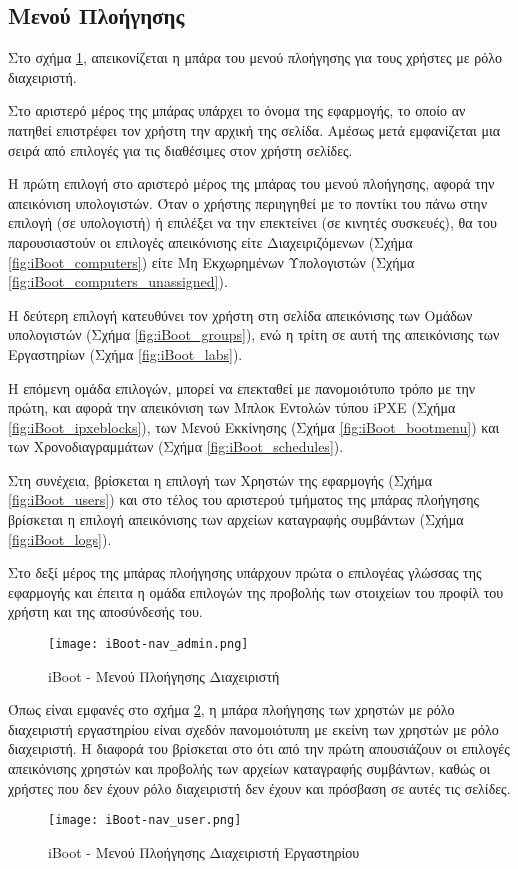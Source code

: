 \subsection{Μενού Πλοήγησης}
\FloatBarrier
Στο σχήμα \ref{fig:iBoot_nav_admin}, απεικονίζεται η μπάρα του μενού πλοήγησης για τους χρήστες με ρόλο διαχειριστή.

Στο αριστερό μέρος της μπάρας υπάρχει το όνομα της εφαρμογής, το οποίο αν πατηθεί επιστρέφει τον χρήστη την αρχική της σελίδα. Αμέσως μετά εμφανίζεται μια σειρά από επιλογές για τις διαθέσιμες στον χρήστη σελίδες.

Η πρώτη επιλογή στο αριστερό μέρος της μπάρας του μενού πλοήγησης, αφορά την απεικόνιση υπολογιστών. Όταν ο χρήστης περιηγηθεί με το ποντίκι του πάνω στην επιλογή (σε υπολογιστή) ή επιλέξει να την επεκτείνει (σε κινητές συσκευές), θα του παρουσιαστούν οι επιλογές απεικόνισης είτε Διαχειριζόμενων (Σχήμα \ref{fig:iBoot_computers}) είτε Μη Εκχωρημένων Υπολογιστών (Σχήμα \ref{fig:iBoot_computers_unassigned}).

Η δεύτερη επιλογή κατευθύνει τον χρήστη στη σελίδα απεικόνισης των Ομάδων υπολογιστών (Σχήμα \ref{fig:iBoot_groups}), ενώ η τρίτη σε αυτή της απεικόνισης των Εργαστηρίων (Σχήμα \ref{fig:iBoot_labs}).

Η επόμενη ομάδα επιλογών, μπορεί να επεκταθεί με πανομοιότυπο τρόπο με την πρώτη, και αφορά την απεικόνιση των Μπλοκ Εντολών τύπου iPXE (Σχήμα \ref{fig:iBoot_ipxeblocks}), των Μενού Εκκίνησης (Σχήμα \ref{fig:iBoot_bootmenu}) και των Χρονοδιαγραμμάτων (Σχήμα \ref{fig:iBoot_schedules}).

Στη συνέχεια, βρίσκεται η επιλογή των Χρηστών της εφαρμογής (Σχήμα \ref{fig:iBoot_users}) και στο τέλος του αριστερού τμήματος της μπάρας πλοήγησης βρίσκεται η επιλογή απεικόνισης των αρχείων καταγραφής συμβάντων (Σχήμα \ref{fig:iBoot_logs}).

Στο δεξί μέρος της μπάρας πλοήγησης υπάρχουν πρώτα ο επιλογέας γλώσσας της εφαρμογής και έπειτα η ομάδα επιλογών της προβολής των στοιχείων του προφίλ του χρήστη και της αποσύνδεσής του.

\begin{figure}[ht]
	\centering
	\texttt{[image: iBoot-nav\_admin.png]}
	\caption{iBoot - Μενού Πλοήγησης Διαχειριστή}
	\label{fig:iBoot_nav_admin}
\end{figure}

Όπως είναι εμφανές στο σχήμα \ref{fig:iBoot_nav_user}, η μπάρα πλοήγησης των χρηστών με ρόλο διαχειριστή εργαστηρίου είναι σχεδόν πανομοιότυπη με εκείνη των χρηστών με ρόλο διαχειριστή. Η διαφορά του βρίσκεται στο ότι από την πρώτη απουσιάζουν οι επιλογές απεικόνισης χρηστών και προβολής των αρχείων καταγραφής συμβάντων, καθώς οι χρήστες που δεν έχουν ρόλο διαχειριστή δεν έχουν και πρόσβαση σε αυτές τις σελίδες.
\begin{figure}[ht]
	\centering
	\texttt{[image: iBoot-nav\_user.png]}
	\caption{iBoot - Μενού Πλοήγησης Διαχειριστή Εργαστηρίου}
	\label{fig:iBoot_nav_user}
\end{figure}

